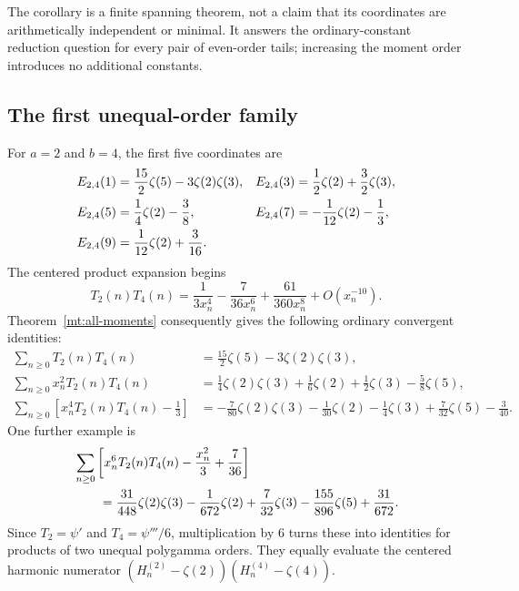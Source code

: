 The corollary is a finite spanning theorem, not a claim that its
coordinates are arithmetically independent or minimal. It answers the
ordinary-constant reduction question for every pair of even-order
tails; increasing the moment order introduces no additional constants.

\subsection{The first unequal-order family}

For $a=2$ and $b=4$, the first five coordinates are
\begin{align}
 E_{2,4}(1)&=\frac{15}{2}\zeta(5)-3\zeta(2)\zeta(3),
 &E_{2,4}(3)&=\frac12\zeta(2)+\frac32\zeta(3),\notag\\
 E_{2,4}(5)&=\frac14\zeta(2)-\frac38,
 &E_{2,4}(7)&=-\frac1{12}\zeta(2)-\frac13,\label{mt:E24}\\
 E_{2,4}(9)&=\frac1{12}\zeta(2)+\frac3{16}.\notag
\end{align}
The centered product expansion begins
\begin{equation}\label{mt:T24-expansion}
 T_2(n)T_4(n)=\frac1{3x_n^4}-\frac7{36x_n^6}
                       +\frac{61}{360x_n^8}+O(x_n^{-10}).
\end{equation}
Theorem~\ref{mt:all-moments} consequently gives the following ordinary
convergent identities:
\begin{align}
 \sum_{n\ge0}T_2(n)T_4(n)
  &=\frac{15}{2}\zeta(5)-3\zeta(2)\zeta(3),
 \label{mt:V0}\\
 \sum_{n\ge0}x_n^2T_2(n)T_4(n)
  &=\frac14\zeta(2)\zeta(3)+\frac16\zeta(2)+\frac12\zeta(3)
                   -\frac58\zeta(5),
 \label{mt:V1}\\
 \sum_{n\ge0}\left[x_n^4T_2(n)T_4(n)-\frac13\right]
  &=-\frac7{80}\zeta(2)\zeta(3)-\frac1{30}\zeta(2)
      -\frac14\zeta(3)+\frac7{32}\zeta(5)-\frac3{40}.
 \label{mt:V2}
\end{align}
One further example is
\begin{align}
 &\sum_{n\ge0}\left[x_n^6T_2(n)T_4(n)-\frac{x_n^2}{3}+\frac7{36}\right]
 \notag\\
 &\qquad=\frac{31}{448}\zeta(2)\zeta(3)-\frac1{672}\zeta(2)
          +\frac7{32}\zeta(3)-\frac{155}{896}\zeta(5)
          +\frac{31}{672}.
 \label{mt:V3}
\end{align}
Since $T_2=\psi'$ and $T_4=\psi'''/6$, multiplication by $6$
turns these into identities for products of two unequal polygamma
orders. They equally evaluate the centered harmonic numerator
$(H_n^{(2)}-\zeta(2))(H_n^{(4)}-\zeta(4))$.

